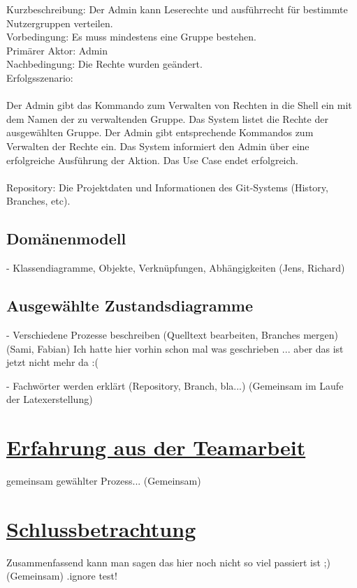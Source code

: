 \documentclass[a4paper]{article}
\begin{document}
Kurzbeschreibung: 	Der Admin kann Leserechte und ausführrecht für bestimmte Nutzergruppen verteilen.\\
Vorbedingung:	Es muss mindestens eine Gruppe bestehen. \\
Primärer Aktor:	Admin\\
Nachbedingung:	Die Rechte wurden geändert. \\
Erfolgsszenario:\\
\\
Der Admin gibt das Kommando zum Verwalten von Rechten in die Shell ein mit dem Namen der zu verwaltenden Gruppe. Das System listet die Rechte der ausgewählten Gruppe. Der Admin gibt entsprechende Kommandos zum Verwalten der Rechte ein. Das System informiert den Admin über eine erfolgreiche Ausführung der Aktion. Das Use Case endet erfolgreich.\\
\\

Repository: Die Projektdaten und Informationen des Git-Systems (History, Branches, etc).
\newpage	
\subsection{Domänenmodell}

	  - Klassendiagramme, Objekte, Verknüpfungen, Abhängigkeiten (Jens, Richard)
\newpage		
\subsection{Ausgewählte Zustandsdiagramme}

	 - Verschiedene Prozesse beschreiben (Quelltext bearbeiten, Branches mergen) (Sami, Fabian)
	 Ich hatte hier vorhin schon mal was geschrieben ... aber das ist jetzt nicht mehr da :(
\newpage	

\printglossary[title={Glossar}, numberedsection]

	 - Fachwörter werden erklärt (Repository, Branch, bla...) (Gemeinsam im Laufe der Latexerstellung) 
\newpage		
\section{\underline{Erfahrung aus der Teamarbeit}}

	gemeinsam gewählter Prozess...
	(Gemeinsam)

\section{\underline{Schlussbetrachtung}}
	
	Zusammenfassend kann man sagen das hier noch nicht so viel passiert ist ;)	
	(Gemeinsam)
	.ignore test!
	
\end{document}
